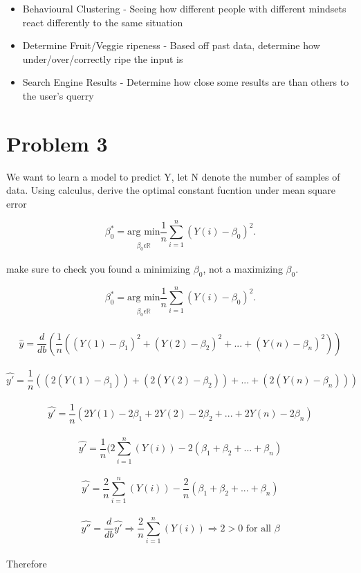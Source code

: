 \documentclass[11pt]{article}
\begin{document}
\begin{enumerate}[label=(\alph*)]
          \begin{itemize}
              \item Behavioural Clustering - Seeing how different people with different mindsets react differently to the same situation
              \item Determine Fruit/Veggie ripeness - Based off past data, determine how under/over/correctly ripe the input is
              \item Search Engine Results - Determine how close some results are than others to the user's querry
          \end{itemize}
\end{enumerate}


\pagebreak
\section{Problem 3}
We want to learn a model to predict Y, let N denote the number of samples of data. Using calculus, derive the optimal constant fucntion under mean square error
\begin{center}
    \[
        \beta_{0}^{*} = \underset{\substack{\\ \beta_{0} \epsilon \mathbb{R} } } {\text{arg min} } \frac{1}{n} \sum_{i = 1}^{n}(Y(i) - \beta_{0})^{2} \text{.}
    \]
\end{center}
make sure to check you found a minimizing $\beta_{0}$, not a maximizing $\beta_{0}$.\\

\begin{center}
    \[
        \beta_{0}^{*} = \underset{\substack{\\ \beta_{0} \epsilon \mathbb{R} } } {\text{arg min} } \frac{1}{n} \sum_{i = 1}^{n}(Y(i) - \beta_{0})^{2} \text{.}
    \]\\
    \[
        \hat{y} = \frac{d}{db}(\frac{1}{n}((Y(1)-\beta_1)^2 + (Y(2)-\beta_2)^2 + ... +(Y(n)-\beta_n)^2))
    \]\\
    \[
        \hat{y'} = \frac{1}{n}((2(Y(1)-\beta_1)) + (2(Y(2)-\beta_2)) + ... + (2(Y(n)-\beta_n)))
    \]\\
    \[
        \hat{y'} = \frac{1}{n}(2Y(1) - 2\beta_1 + 2Y(2) - 2\beta_2 + ... + 2Y(n) - 2\beta_n)
    \]\\
    \[
        \hat{y'} = \frac{1}{n}(2\sum_{i=1}^{n}(Y(i)) - 2(\beta_1 + \beta_2 + ... + \beta_n)
    \]\\
    \[
        \hat{y'} = \frac{2}{n}\sum_{i=1}^{n}(Y(i)) - \frac{2}{n}(\beta_1 + \beta_2 + ... + \beta_n)
    \]\\
    \[
        \hat{y''} = \frac{d}{db}\hat{y'}\Rightarrow \frac{2}{n}\sum_{i=1}^{n}(Y(i)) \Rightarrow 2 > 0 \text{ for all }\beta
    \]\\
    Therefore
    \[

    \]
\end{center}

\end{document}
